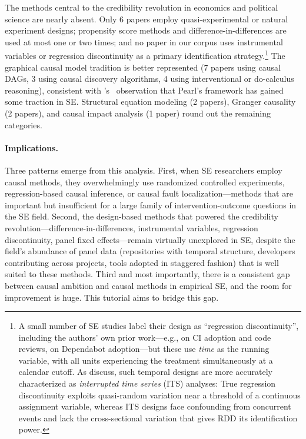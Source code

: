 The methods central to the credibility revolution in economics and political science are nearly absent.
Only 6 papers employ quasi-experimental or natural experiment designs; propensity score methods and difference-in-differences are used at most one or two times; and no paper in our corpus uses instrumental variables or regression discontinuity as a primary identification strategy.\footnote{A small number of SE studies label their design as ``regression discontinuity'', including the authors' own prior work---e.g., \citet{DBLP:conf/wcre/CasseeVS20} on CI adoption and code reviews, \citet{DBLP:journals/tse/HeHZZ23} on Dependabot adoption---but these use \emph{time} as the running variable, with all units experiencing the treatment simultaneously at a calendar cutoff.
As \citet{hausman2018regression} discuss, such temporal designs are more accurately characterized as \emph{interrupted time series} (ITS) analyses: True regression discontinuity exploits quasi-random variation near a threshold of a continuous assignment variable, whereas ITS designs face confounding from concurrent events and lack the cross-sectional variation that gives RDD its identification power.}
The graphical causal model tradition is better represented (7 papers using causal DAGs, 3 using causal discovery algorithms, 4 using interventional or do-calculus reasoning), consistent with \citeauthor{DBLP:journals/infsof/Siebert23}'s~\cite{DBLP:journals/infsof/Siebert23} observation that Pearl's framework has gained some traction in SE\@.
Structural equation modeling (2 papers), Granger causality (2 papers), and causal impact analysis (1 paper) round out the remaining categories.

\paragraph{Implications.}
Three patterns emerge from this analysis.
First, when SE researchers employ causal methods, they overwhelmingly use randomized controlled experiments, regression-based causal inference, or causal fault localization---methods that are important but insufficient for a large family of intervention-outcome questions in the SE field.
Second, the design-based methods that powered the credibility revolution---difference-in-differences, instrumental variables, regression discontinuity, panel fixed effects---remain virtually unexplored in SE, despite the field's abundance of panel data (repositories with temporal structure, developers contributing across projects, tools adopted in staggered fashion) that is well suited to these methods.
Third and most importantly, there is a consistent gap between causal ambition and causal methods in empirical SE, and the room for improvement is huge.
This tutorial aims to bridge this gap.
